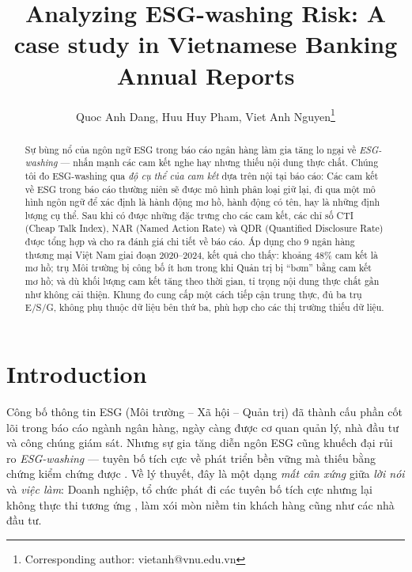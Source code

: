 \documentclass[runningheads]{llncs}
\begin{document}
%
\title{Analyzing ESG-washing Risk: A case study in Vietnamese Banking Annual Reports}
%
%
\author{Quoc Anh Dang, Huu Huy Pham, Viet Anh Nguyen\thanks{Corresponding author: vietanh@vnu.edu.vn}}
%
%
%
\maketitle              %
%
\begin{abstract}
Sự bùng nổ của ngôn ngữ ESG trong báo cáo ngân hàng làm gia tăng lo ngại về \emph{ESG-washing} --- nhấn mạnh các cam kết nghe hay nhưng thiếu nội dung thực chất. Chúng tôi đo ESG-washing qua \emph{độ cụ thể của cam kết} dựa trên nội tại báo cáo: Các cam kết về ESG trong báo cáo thường niên sẽ được mô hình phân loại giữ lại, đi qua một mô hình ngôn ngữ để xác định là hành động mơ hồ, hành động có tên, hay là những định lượng cụ thể. Sau khi có được những đặc trưng cho các cam kết, các chỉ số CTI (Cheap Talk Index), NAR (Named Action Rate) và QDR (Quantified Disclosure Rate) được tổng hợp và cho ra đánh giá chi tiết về báo cáo. Áp dụng cho 9 ngân hàng thương mại Việt Nam giai đoạn 2020--2024, kết quả cho thấy: khoảng $48\%$ cam kết là mơ hồ; trụ Môi trường bị công bố ít hơn trong khi Quản trị bị ``bơm'' bằng cam kết mơ hồ; và dù khối lượng cam kết tăng theo thời gian, tỉ trọng nội dung thực chất gần như không cải thiện. Khung đo cung cấp một cách tiếp cận trung thực, đủ ba trụ E/S/G, không phụ thuộc dữ liệu bên thứ ba, phù hợp cho các thị trường thiếu dữ liệu.


\end{abstract}
%
\section{Introduction}
Công bố thông tin ESG (Môi trường -- Xã hội -- Quản trị) đã thành cấu phần cốt lõi trong báo cáo ngành ngân hàng, ngày càng được cơ quan quản lý, nhà đầu tư và công chúng giám sát. Nhưng sự gia tăng diễn ngôn ESG cũng khuếch đại rủi ro \emph{ESG-washing} --- tuyên bố tích cực về phát triển bền vững mà thiếu bằng chứng kiểm chứng được \cite{florstedt2025detecting,delmas2011drivers}. Về lý thuyết, đây là một dạng \emph{mất cân xứng} giữa \emph{lời nói} và \emph{việc làm}: Doanh nghiệp, tổ chức phát đi các tuyên bố tích cực nhưng lại không thực thi tương ứng \cite{bromley2012smoke,marquis2016scrutiny}, làm xói mòn niềm tin khách hàng cũng như các nhà đầu tư\cite{lagasio2024esg,kathan2025you}.
\end{document}
